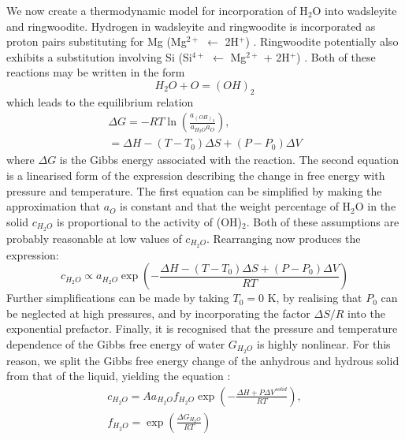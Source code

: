 \documentclass[review]{elsarticle}
\begin{document}
We now create a thermodynamic model for incorporation of H$_2$O into wadsleyite and ringwoodite. Hydrogen in wadsleyite and ringwoodite is incorporated as proton pairs substituting for Mg (Mg$^{2+}$ $\leftarrow$ 2H$^{+}$) \citep{Smyth1987, SHFJLM2003}. Ringwoodite potentially also exhibits a substitution involving Si (Si$^{4+}$ $\leftarrow$ Mg$^{2+}$ + 2H$^{+}$) \citep{KKMO2000}. Both of these reactions may be written in the form 
\begin{equation}
H_2O + O = (OH)_2
\end{equation}
which leads to the equilibrium relation 
\begin{eqnarray}
\Delta G = -R T \ln \left( \frac{a_{(OH)_2}}{a_{H_2O}a_{O}} \right), \\
= \Delta H - (T-T_0) \Delta S + (P-P_0) \Delta V
\end{eqnarray}
where $\Delta G$ is the Gibbs energy associated with the reaction. The second equation is a linearised form of the expression describing the change in free energy with pressure and temperature. The first equation can be simplified by making the approximation that $a_O$ is constant and that the weight percentage of H$_2$O in the solid $c_{H_2O}$ is proportional to the activity of (OH)$_2$. Both of these assumptions are probably reasonable at low values of $c_{H_2O}$. Rearranging now produces the expression:
\begin{equation}
c_{H_2O} \propto a_{H_2O} \exp{ \left( -\frac{\Delta H - (T-T_0) \Delta S + (P-P_0) \Delta V}{R T} \right) }
\end{equation}
Further simplifications can be made by taking $T_0 = 0$ K, by realising that $P_0$ can be neglected at high pressures, and by incorporating the factor $\Delta S/R$ into the exponential prefactor. Finally, it is recognised that the pressure and temperature dependence of the Gibbs free energy of water $G_{H_2O}$ is highly nonlinear. For this reason, we split the Gibbs free energy change of the anhydrous and hydrous solid from that of the liquid, yielding the equation \citep{KB2006}:
\begin{eqnarray}
c_{H_2O} = A a_{H_2O} f_{H_2O} \exp{ \left( -\frac{\Delta H + P \Delta V^{solid}}{R T} \right) }, \\
f_{H_2O} = \exp \left(\frac{\Delta G_{H_2O}}{RT} \right)
\end{eqnarray}
\end{document}
